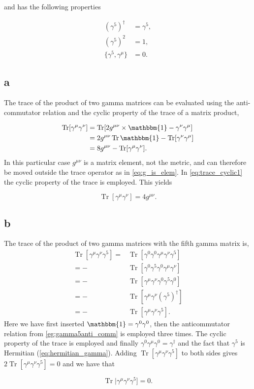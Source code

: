 \documentclass[11pt, a4paper]{amsart}
\DeclareMathOperator{\Tr}{Tr}
\begin{document}
and has the following properties

\begin{align}
(\gamma^5)^\dagger &= \gamma^5, \label{eq:hermitian_gamma}\\
(\gamma^5)^2 &= 1, \\
\{\gamma^5, \gamma^\mu \} &= 0 \label{eg:gamma5anti_comm}.
\end{align}

\subsection*{a}

The trace of the product of two gamma matrices can be evaluated using the anti-commutator relation and the cyclic property of the trace of a matrix product,

\begin{align}
\Tr[\gamma^\mu \gamma^\nu] &= \Tr[2g^{\mu\nu} \times \mathbbm{1} - \gamma^\nu\gamma^\mu] \\
   &= 2g^{\mu\nu} \Tr \mathbbm{1} - \Tr[\gamma^\nu\gamma^\mu] \label{eq:g_is_elem} \\
   &= 8g^{\mu\nu} - \Tr[\gamma^\mu\gamma^\nu] \label{eq:trace_cyclic1}.
\end{align}
In this particular case $g^{\mu\nu}$ is a matrix element, not the metric, and can therefore be moved outside the trace operator as in \ref{eq:g_is_elem}. In \ref{eq:trace_cyclic1} the cyclic property of the trace is employed. This yields

\begin{equation}
\Tr[\gamma^\mu\gamma^\nu] = 4g^{\mu\nu}.
\end{equation}

\subsection{b}

The trace of the product of two gamma matrices with the fifth gamma matrix is,
\begin{align}
\Tr[\gamma^\mu\gamma^\nu\gamma^5] = &\Tr[\gamma^0\gamma^0\gamma^\mu\gamma^\nu\gamma^5] \\
  = -&\Tr[ \gamma^0\gamma^5\gamma^0 \gamma^\mu \gamma^\nu]  \\
  = -&\Tr[\gamma^\mu\gamma^\nu\gamma^0\gamma^5\gamma^0]  \\
  = -&\Tr[\gamma^\mu\gamma^\nu(\gamma^5)^\dagger] \\
  = -&\Tr[\gamma^\mu\gamma^\nu\gamma^5] .
\end{align}
Here we have first inserted $\mathbbm{1} = \gamma^0\gamma^0$, then the anticommutator relation from \autoref{eg:gamma5anti_comm} is employed three times. The cyclic property of the trace is employed and finally $\gamma^0\gamma^\mu\gamma^0 = \gamma^\dagger$ and the fact that $\gamma^5$ is Hermitian (\autoref{eq:hermitian_gamma}). Adding $\Tr[\gamma^\mu\gamma^\nu\gamma^5]$ to both sides gives $2\Tr[\gamma^\mu\gamma^\nu\gamma^5] = 0$ and we have that

\begin{equation}
\Tr|\gamma^\mu\gamma^\nu\gamma^5] = 0.
\end{equation}


 
\end{document}
